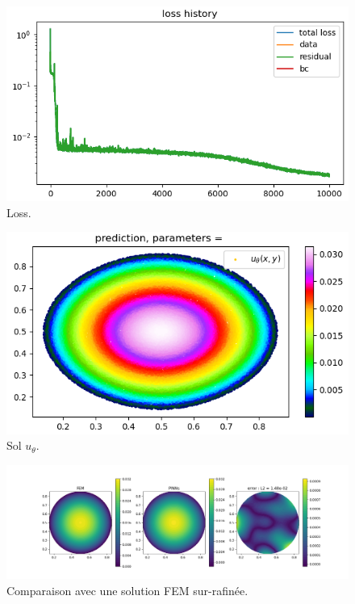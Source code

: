 \documentclass[french]{article}
\begin{document}
	\begin{minipage}{0.48\linewidth}
		\begin{figure}[H]
			\centering
			\includegraphics[width=0.9\linewidth]{"poisson/circle/loss.png"}
			\caption{Loss.}
		\end{figure}
	\end{minipage}
	\begin{minipage}{0.48\linewidth}
		\begin{figure}[H]
			\centering
			\includegraphics[width=0.9\linewidth]{"poisson/circle/sol.png"}
			\caption{Sol $u_\theta$.}
		\end{figure}
	\end{minipage}
	
	\begin{figure}[H]
			\centering
			\includegraphics[width=\linewidth]{"poisson/circle/compare.png"}
			\caption{Comparaison avec une solution FEM sur-rafinée.}
	\end{figure}
\end{document}
